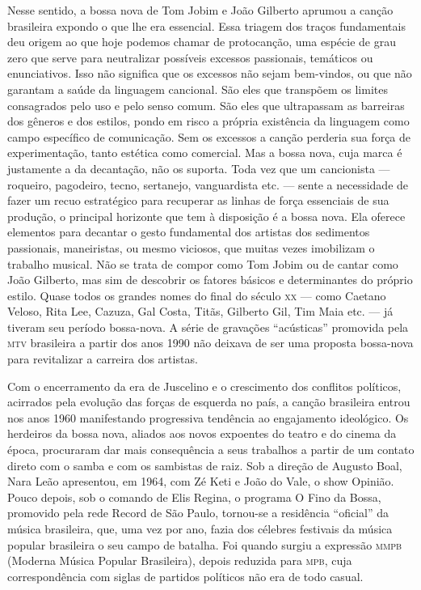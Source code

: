 Nesse sentido, a bossa nova de Tom Jobim e João Gilberto aprumou a
canção brasileira expondo o que lhe era essencial. Essa triagem dos
traços fundamentais deu origem ao que hoje podemos chamar de
protocanção, uma espécie de grau zero que serve para neutralizar
possíveis excessos passionais, temáticos ou enunciativos. Isso não
significa que os excessos não sejam bem-vindos, ou que não garantam a
saúde da linguagem cancional. São eles que transpõem os limites
consagrados pelo uso e pelo senso comum. São eles que ultrapassam as
barreiras dos gêneros e dos estilos, pondo em risco a própria existência
da linguagem como campo específico de comunicação. Sem os excessos a
canção perderia sua força de experimentação, tanto estética como
comercial. Mas a bossa nova, cuja marca é justamente a da decantação,
não os suporta. Toda vez que um cancionista --- roqueiro, pagodeiro,
tecno, sertanejo, vanguardista etc. --- sente a necessidade de fazer um
recuo estratégico para recuperar as linhas de força essenciais de sua
produção, o principal horizonte que tem à disposição é a bossa nova. Ela
oferece elementos para decantar o gesto fundamental dos artistas dos
sedimentos passionais, maneiristas, ou mesmo viciosos, que muitas vezes
imobilizam o trabalho musical. Não se trata de compor como Tom Jobim ou
de cantar como João Gilberto, mas sim de descobrir os fatores básicos e
determinantes do próprio estilo. Quase todos os grandes nomes do final
do século \textsc{xx} --- como Caetano Veloso, Rita Lee, Cazuza, Gal Costa,
Titãs, Gilberto Gil, Tim Maia etc. --- já tiveram seu período
bossa-nova. A série de gravações ``acústicas'' promovida pela \textsc{mtv}
brasileira a partir dos anos 1990 não deixava de ser uma proposta
bossa-nova para revitalizar a carreira dos artistas.

Com o encerramento da era de Juscelino e o crescimento dos conflitos
políticos, acirrados pela evolução das forças de esquerda no país, a
canção brasileira entrou nos anos 1960 manifestando progressiva
tendência ao engajamento ideológico. Os herdeiros da bossa nova, aliados
aos novos expoentes do teatro e do cinema da época, procuraram dar mais
consequência a seus trabalhos a partir de um contato direto com o samba
e com os sambistas de raiz. Sob a direção de Augusto Boal, Nara Leão
apresentou, em 1964, com Zé Keti e João do Vale, o show Opinião. Pouco
depois, sob o comando de Elis Regina, o programa O Fino da Bossa,
promovido pela rede Record de São Paulo, tornou-se a residência
``oficial'' da música brasileira, que, uma vez por ano, fazia dos
célebres festivais da música popular brasileira o seu campo de batalha.
Foi quando surgiu a expressão \textsc{mmpb} (Moderna Música Popular Brasileira),
depois reduzida para \textsc{mpb}, cuja correspondência com siglas de partidos
políticos não era de todo casual.

